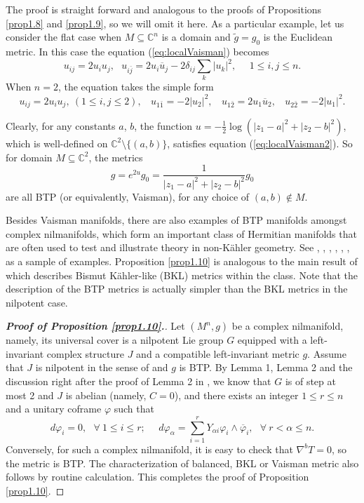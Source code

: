 \documentclass{amsart}
\numberwithin{equation}{section}
\theoremstyle{definition}
\renewcommand{\1}{\mathds{1}}
\renewcommand{\>}{\rightarrow}
\begin{document}
The proof is straight forward and analogous to the proofs of Propositions \ref{prop1.8} and \ref{prop1.9}, so we will omit it here.
As a particular example, let us consider the flat case when $M\subseteq {\mathbb C}^n$ is a domain and $\tilde{g}=g_0$ is the  Euclidean metric. In this case the equation (\ref{eq:localVaisman}) becomes
$$ u_{ij}=2u_iu_j, \ \ \ u_{i\bar{j}} = 2u_i \overline{u}_j - 2 \delta_{ij} \sum_k |u_k|^2, \ \ \ \ \ \ 1\leq i,j\leq n. $$
When $n=2$, the equation takes the simple form
\begin{equation} \label{eq:localVaisman2}
 u_{ij}=2u_iu_j, \ (1\leq i,j\leq 2), \ \ \ \ u_{1\bar{1}}=-2|u_2|^2, \ \ \ \  u_{1\bar{2}} = 2u_1\overline{u}_2, \ \ \ \ u_{2\bar{2}} = -2 |u_1|^2.
\end{equation}

Clearly, for any constants $a$, $b$, the function $u=-\frac{1}{2}\log (|z_1-a|^2+|z_2-b|^2)$, which is well-defined on ${\mathbb C}^2\setminus \{ (a,b)\}$,
satisfies equation (\ref{eq:localVaisman2}). So for domain  $M\subseteq {\mathbb C}^2$, the metrics
$$g = e^{2u}g_0 = \frac{1}{|z_1-a|^2+|z_2-b|^2}g_0$$
are all BTP (or equivalently, Vaisman), for any choice of $(a,b)\notin M$.



Besides Vaisman manifolds, there are also examples of BTP manifolds amongst complex nilmanifolds, which form an important class of Hermitian manifolds that are often used to test and illustrate theory in non-K\"ahler geometry. See \cite{CFU}, \cite{GZZ}, \cite{LZ}, \cite{Sal}, \cite{Uga}, \cite{VYZ}, \cite{LS} as a sample of examples. Proposition \ref{prop1.10} is analogous to the main result of \cite{ZhaoZ19Nil} which describes Bismut K\"ahler-like (BKL) metrics within the class. Note that the description of the BTP metrics is actually simpler than the BKL metrics in the nilpotent case.

\begin{proof}[{\bf Proof of Proposition \ref{prop1.10}.}]
Let $(M^n,g)$ be a complex nilmanifold, namely, its universal cover is a nilpotent Lie group $G$ equipped with a left-invariant complex structure $J$ and a compatible left-invariant metric $g$. Assume that $J$ is nilpotent in the sense of \cite{CFGU} and $g$ is BTP. By Lemma 1, Lemma 2 and the discussion right after the proof of Lemma 2 in \cite{ZhaoZ19Nil}, we know that $G$ is of step at most 2 and $J$ is abelian (namely, $C=0$), and there exists an integer $1\leq r\leq n$ and a unitary coframe $\varphi$ such that
$$ d\varphi_i =0, \ \ \ \forall \ 1\leq i\leq r; \ \ \ \ \ \ d\varphi_{\alpha} = \sum_{i=1}^r Y_{\alpha i} \varphi_i \wedge \overline{\varphi}_i , \ \ \ \forall \ r<\alpha \leq n. $$
Conversely, for such a complex nilmanifold, it is easy to check that $\nabla^bT=0$, so the metric is BTP.
The characterization of balanced, BKL or Vaisman metric also follows by routine calculation.
This completes the proof of Proposition \ref{prop1.10}. \end{proof}
\end{document}
